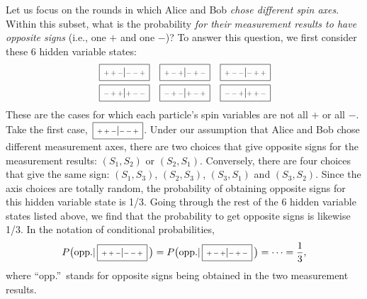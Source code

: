 \documentclass[pra,12pt]{revtex4-2}
\def\hvbox[#1]#2{\,\boxed{\scalebox{0.7}{$\,#1$}|\scalebox{0.7}{$#2\,$}}}
\begin{document}
Let us focus on the rounds in which Alice and Bob \textit{chose
  different spin axes}.  Within this subset, what is the probability
\textit{for their measurement results to have opposite signs} (i.e.,
one $+$ and one $-$)?  To answer this question, we first consider
these 6 hidden variable states:
\begin{align*}
  \begin{aligned}
    \hvbox[++-]{--+} \;\;\;
    \hvbox[+-+]{-+-} \;\;\;
    \hvbox[+--]{-++}\\
    \hvbox[-++]{+--} \;\;\;
    \hvbox[-+-]{+-+} \;\;\;
    \hvbox[--+]{++-}
  \end{aligned}
\end{align*}
These are the cases for which each particle's spin variables are not
all $+$ or all $-$.  Take the first case, $\hvbox[++-]{--+}$.  Under
our assumption that Alice and Bob chose different measurement axes,
there are two choices that give opposite signs for the measurement
results: $(S_1,S_2)$ or $(S_2,S_1)$.  Conversely, there are four
choices that give the same sign: $(S_1,S_3)$, $(S_2,S_3)$, $(S_3,S_1)$
and $(S_3, S_2)$.  Since the axis choices are totally random, the
probability of obtaining opposite signs for this hidden variable state
is 1/3.  Going through the rest of the 6 hidden variable states listed
above, we find that the probability to get opposite signs is likewise
1/3.  In the notation of conditional probabilities,
\begin{equation}
  P\big(\textrm{opp.} | \hvbox[++-]{--+}\,\big) =
  P\big(\textrm{opp.} | \hvbox[+-+]{-+-}\,\big) = \cdots = \frac{1}{3},
  \label{bell1}
\end{equation}
where ``opp.''~stands for opposite signs being obtained in the two
measurement results.
\end{document}
